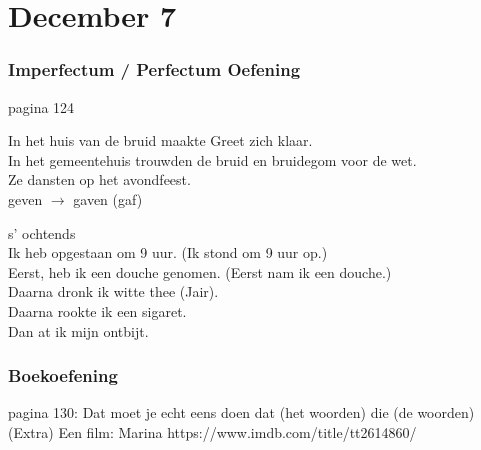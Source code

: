 \documentclass[usenames,dvipsnames]{beamer}
\begin{document}
	\section{December 7}
	\begin{frame}
		\frametitle{Imperfectum / Perfectum Oefening}
		pagina 124 \break

		In het huis van de bruid maakte Greet zich klaar. \\
		In het gemeentehuis trouwden de bruid en bruidegom voor de wet. \\
		Ze dansten op het avondfeest. \\

		geven $\rightarrow$ gaven (gaf) \break

		s' ochtends \\
		Ik heb opgestaan om 9 uur. (Ik stond om 9 uur op.) \\
		Eerst, heb ik een douche genomen. (Eerst nam ik een douche.) \\
		Daarna dronk ik witte thee (Jair). \\
		Daarna rookte ik een sigaret. \\
		Dan at ik mijn ontbijt.

	\end{frame}


	\begin{frame}
		\frametitle{Boekoefening}

		\begin{outline}
			\1 pagina 130: Dat moet je echt eens doen
				\2 dat (het woorden)
				\2 die (de woorden)
			\1 (Extra) Een film: Marina
				\2 https://www.imdb.com/title/tt2614860/
		\end{outline}

	\end{frame}
\end{document}
